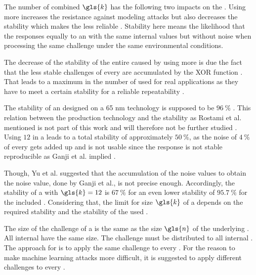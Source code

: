 The number of combined \apufs $\gls{k}$ has the following two impacts on the \puf.
Using more \apufs increases the resistance against modeling attacks but also decreases the stability which makes the \puf less reliable \cite{Becker2015ThePUFs, Ganji2015WhyPUFs}. %
Stability here means the likelihood that the \apuf responses equally to an \apuf with the same internal values but without noise when processing the same challenge under the same environmental conditions. %

The decrease of the stability of the entire \xpuf caused by using more \apufs is due the fact that the less stable challenges of every \apuf are accumulated by the \ac{XOR} function \cite{Rostami2014RobustMatching}.
That leads to a maximum in the number of used \apufs for real applications as they have to meet a certain stability for a reliable repeatability \cite{Rostami2014RobustMatching}.

The stability of an \apuf designed on a 65 nm technology is supposed to be $96\ \%$ \cite{Rostami2014RobustMatching}.
This relation between the production technology and the stability as Rostami et al. mentioned is not part of this work and will therefore not be further studied \cite{Rostami2014RobustMatching}. %
Using $12$ \apufs in a \xpuf leads to a total stability of approximately $50\ \%$, as the noise of $4\ \%$ of every \apuf gets added up and is not usable since the response is not stable reproducible as Ganji et al. implied \cite{Ganji2015WhyPUFs}. %

Though, Yu et al. suggested that the accumulation of the \apuf noise values to obtain the \xpuf noise value, done by Ganji et al., is not precise enough.
Accordingly, the stability of a \xpuf with $\gls{k} = 12$ is $67\ \%$ for an even lower stability of $95.7\ \%$ for the included \apufs \cite{Yu2016AAuthentication}. %
Considering that, the limit for size $\gls{k}$ of a \xpuf depends on the required stability and the stability of the used \apufs.

The size of the challenge of a \xpuf is the same as the size $\gls{n}$ of the underlying \apufs.
All internal \apufs have the same size.
The challenge must be distributed to all internal \apufs. %
The approach for \xpufs is to apply the same challenge to every \apuf.
For the reason to make machine learning attacks more difficult, it is suggested to apply different challenges to every \apuf. %

